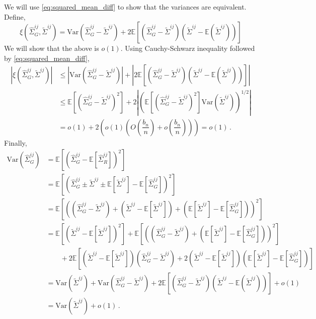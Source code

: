 \documentclass[11pt]{article}
\newcommand{\E}{\mathbb{E}}
\newcommand{\Var}{\text{Var}}
\theoremstyle{remark}
\begin{document}
%
We will use \eqref{eq:squared_mean_diff} to show that the variances are equivalent. Define,
\[
\xi\left(\hat{\Sigma}_{G}^{ij}, \tilde{\Sigma}^{ij} \right) = \Var\left(\hat{\Sigma}_{G}^{ij} - \tilde{\Sigma}^{ij} \right) + 2 \E\left[ \left(\hat{\Sigma}_{G}^{ij} -  \tilde{\Sigma}^{ij} \right) \left(\tilde{\Sigma}^{ij}  - \E \left( \tilde{\Sigma}^{ij} \right) \right) \right]
\]
We will show that the above is $o(1)$. Using Cauchy-Schwarz inequality followed by \eqref{eq:squared_mean_diff},
\begin{align*}
\left|  \xi\left(\hat{\Sigma}_{G}^{ij}, \tilde{\Sigma}^{ij} \right) \right| & \leq \left| \Var\left(\hat{\Sigma}_{G}^{ij} -  \tilde{\Sigma}^{ij} \right) \right| + \left| 2 \E\left[ \left(\hat{\Sigma}_{G}^{ij} - \tilde{\Sigma}^{ij} \right) \left(\tilde{\Sigma}^{ij}  - \E \left( \tilde{\Sigma}^{ij} \right) \right) \right]\right| \\ 
& \leq \E\left[\left(\hat{\Sigma}_{G}^{ij} -  \tilde{\Sigma}^{ij} \right)^2 \right] + 2 \left| \left(\E\left[ \left(\hat{\Sigma}_{G}^{ij} - \tilde{\Sigma}^{ij} \right)^2 \right]  \Var\left(\tilde{\Sigma}^{ij}  \right)   \right)^{1/2}\right| \\ 
& = o(1) + 2\left(o(1) \left(O\left( \dfrac{b_n}{n}\right)  + o\left( \dfrac{b_n}{n}\right) \right)  \right) = o(1)\,.
\end{align*}
%
Finally,
\begin{align*}
 \Var\left(\hat{\Sigma}_{G}^{ij} \right)  & = \E \left[ \left(\hat{\Sigma}_{G}^{ij}  - \E \left[\hat{\Sigma}_{R}^{ij}  \right] \right)^2 \right]\\
& = \E \left[ \left(\hat{\Sigma}_{G}^{ij} \pm \tilde{\Sigma}^{ij} \pm \E \left[ \tilde{\Sigma}^{ij}\right] - \E \left[\hat{\Sigma}_{G}^{ij}  \right] \right)^2 \right]\\
& = \E\left[ \left( \left(\hat{\Sigma}_{G}^{ij} - \tilde{\Sigma}^{ij} \right) + \left(\tilde{\Sigma}^{ij}  - \E\left[\tilde{\Sigma}^{ij}\right]\right) + \left(\E\left[\tilde{\Sigma}^{ij}\right] - \E \left[\hat{\Sigma}_{G}^{ij}  \right] \right)  \right)^2 \right] \\ 
& =  \E\left[ \left(\tilde{\Sigma}^{ij}  - \E\left[\tilde{\Sigma}^{ij}\right]\right)^2 \right] + \E \left[ \left(\left(\hat{\Sigma}_{G}^{ij} - \tilde{\Sigma}^{ij} \right) + \left(\E\left[\tilde{\Sigma}^{ij}\right] - \E \left[\hat{\Sigma}_{G}^{ij}  \right] \right) \right)^2 \right] \\
& \quad \quad + 2\E\left[\left(\tilde{\Sigma}^{ij}  - \E\left[\tilde{\Sigma}^{ij}\right]\right) \left(\hat{\Sigma}_{G}^{ij} - \tilde{\Sigma}^{ij} \right) + 2 \left(\tilde{\Sigma}^{ij}  - \E\left[\tilde{\Sigma}^{ij}\right]\right) \left(\E \left[\tilde{\Sigma}^{ij}\right] - \E \left[\hat{\Sigma}_{G}^{ij}  \right] \right)\right]\\
& = \Var\left( \tilde{\Sigma}^{ij}\right) + \Var\left(\hat{\Sigma}_{G}^{ij} - \tilde{\Sigma}^{ij} \right) + 2 \E\left[ \left(\hat{\Sigma}_{G}^{ij} -  \tilde{\Sigma}^{ij} \right) \left(\tilde{\Sigma}^{ij}  - \E \left( \tilde{\Sigma}^{ij} \right) \right) \right] + o(1)\\
& = \Var\left( \tilde{\Sigma}^{ij}\right) + o(1)\,.
\end{align*}
\end{document}
